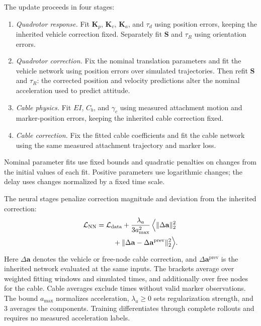 \documentclass[letterpaper, 10 pt, conference]{ieeeconf}
\begin{document}
The update proceeds in four stages:
\begin{enumerate}
    \item \emph{Quadrotor response.}
    Fit $\mathbf K_p$, $\mathbf K_v$, $\mathbf K_a$, and
    $\tau_d$ using position errors, keeping the inherited vehicle
    correction fixed. Separately fit $\mathbf S$ and $\tau_R$
    using orientation errors.

    \item \emph{Quadrotor correction.}
    Fix the nominal translation parameters and fit the vehicle
    network using position errors over simulated trajectories.
    Then refit $\mathbf S$ and $\tau_R$: the corrected position
    and velocity predictions alter the nominal acceleration
    used to predict attitude.

    \item \emph{Cable physics.}
    Fit $EI$, $C_b$, and $\gamma_c$ using measured attachment
    motion and marker-position errors, keeping the inherited
    cable correction fixed.

    \item \emph{Cable correction.}
    Fix the fitted cable coefficients and fit the cable network
    using the same measured attachment trajectory and marker loss.
\end{enumerate}

Nominal parameter fits use fixed bounds and quadratic penalties
on changes from the initial values of each fit. Positive parameters
use logarithmic changes; the delay uses changes normalized by a
fixed time scale.

The neural stages penalize correction magnitude and deviation
from the inherited correction:
\begin{equation}
\begin{aligned}
\mathcal L_{\mathrm{NN}}
={}&\mathcal L_{\mathrm{data}}+\frac{\lambda_a}{3a_{\max}^2}\,
\Bigl\langle\|\Delta\mathbf a\|_2^2\\
&\quad+\|\Delta\mathbf a-\Delta\mathbf a^{\mathrm{prev}}\|_2^2\Bigr\rangle.
\end{aligned}
\label{eq:refinement_neural_loss}
\end{equation}
Here $\Delta\mathbf a$ denotes the vehicle or free-node cable
correction, and $\Delta\mathbf a^{\mathrm{prev}}$ is the
inherited network evaluated at the same inputs.
The brackets average over weighted fitting windows and simulated
times, and additionally over free nodes for the cable. Cable
averages exclude times without valid marker observations.
The bound $a_{\max}$ normalizes acceleration, $\lambda_a\geq0$
sets regularization strength, and $3$ averages the components.
Training differentiates through complete rollouts and requires
no measured acceleration labels.
\end{document}
